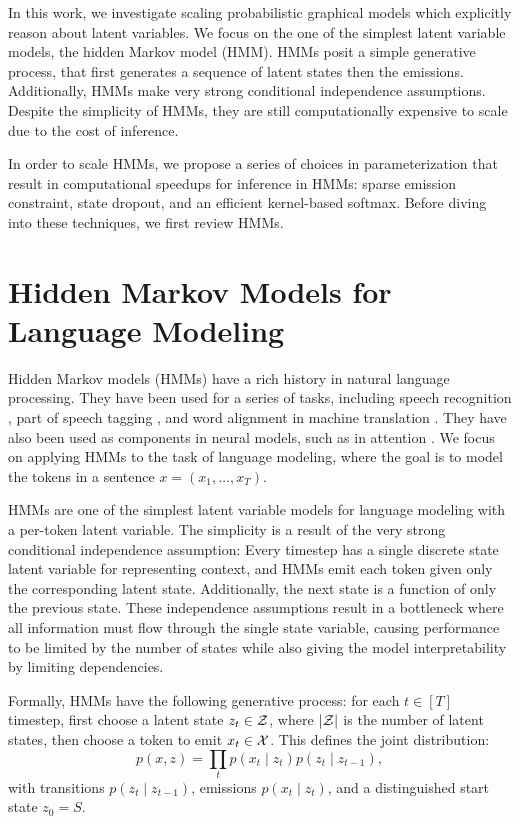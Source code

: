 \documentclass{article}
\begin{document}
In this work, we investigate scaling probabilistic graphical models
which explicitly reason about latent variables.
We focus on the one of the simplest latent variable models,
the hidden Markov model (HMM).
HMMs posit a simple generative process, that first generates a sequence of
latent states then the emissions.
Additionally, HMMs make very strong conditional independence assumptions.
Despite the simplicity of HMMs,
they are still computationally expensive to scale
due to the cost of inference.

In order to scale HMMs, we propose a series of choices in parameterization
that result in computational speedups for inference in HMMs:
sparse emission constraint, state dropout, and an efficient kernel-based softmax.
Before diving into these techniques, we first review HMMs.

\section{Hidden Markov Models for Language Modeling}
Hidden Markov models (HMMs) have a rich history in natural language processing.
They have been used for a series of tasks, including
speech recognition \citep{rabiner1990tut},
part of speech tagging \citep{merialdo1994tagging}, 
and word alignment in machine translation \citep{vogel1996hmm}.
They have also been used as components in neural models,
such as in attention \citep{shankar2018posterior}.
We focus on applying HMMs to the task of language modeling,
where the goal is to model the tokens in a sentence $x = (x_1,\ldots,x_T)$.

HMMs are one of the simplest latent variable models for language modeling
with a per-token latent variable.
The simplicity is a result of the very strong conditional independence assumption:
Every timestep has a single discrete state latent variable for representing context,
and HMMs emit each token given only the corresponding latent state.
Additionally, the next state is a function of only the previous state.
These independence assumptions result in a bottleneck where all information
must flow through the single state variable,
causing performance to be limited by the number of states
while also giving the model interpretability by limiting dependencies.

Formally, HMMs have the following generative process:
for each $t \in [T]$ timestep, first choose a latent state $z_t \in \mathcal{Z}$,
where $|\mathcal{Z}|$ is the number of latent states,
then choose a token to emit $x_t \in \mathcal{X}$.
This defines the joint distribution:
\begin{equation}
p(x,z) = \prod_t p(x_t\mid z_t) p(z_t \mid z_{t-1}),
\end{equation}
with transitions $p(z_t \mid z_{t-1})$, emissions $p(x_t \mid z_t)$,
and a distinguished start state $z_0 = S$.
\end{document}
